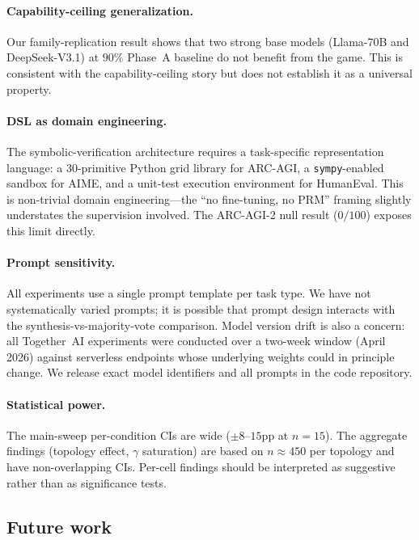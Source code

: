 \documentclass[11pt]{amsart}
\newcommand{\g}{\gamma}
\newcommand\1{{\mathds{1}}}
\theoremstyle{definition}
\theoremstyle{remark}
\numberwithin{equation}{section}
\begin{document}
\paragraph{Capability-ceiling generalization.}
Our family-replication result shows that two strong base models (Llama-70B and DeepSeek-V3.1) at $90\%$ Phase~A baseline do not benefit from the game.
This is consistent with the capability-ceiling story but does not establish it as a universal property.

\paragraph{DSL as domain engineering.}
The symbolic-verification architecture requires a task-specific representation language: a $30$-primitive Python grid library for ARC-AGI, a \texttt{sympy}-enabled sandbox for AIME, and a unit-test execution environment for HumanEval.
This is non-trivial domain engineering---the ``no fine-tuning, no PRM'' framing slightly understates the supervision involved.
The ARC-AGI-2 null result ($0/100$) exposes this limit directly.

\paragraph{Prompt sensitivity.}
All experiments use a single prompt template per task type.
We have not systematically varied prompts; it is possible that prompt design interacts with the synthesis-vs-majority-vote comparison.
Model version drift is also a concern: all Together~AI experiments were conducted over a two-week window (April 2026) against serverless endpoints whose underlying weights could in principle change.
We release exact model identifiers and all prompts in the code repository.

\paragraph{Statistical power.}
The main-sweep per-condition CIs are wide ($\pm 8$--$15$pp at $n = 15$).
The aggregate findings (topology effect, $\g$ saturation) are based on $n \approx 450$ per topology and have non-overlapping CIs.
Per-cell findings should be interpreted as suggestive rather than as significance tests.

\subsection{Future work}\label{app:future}
\end{document}
